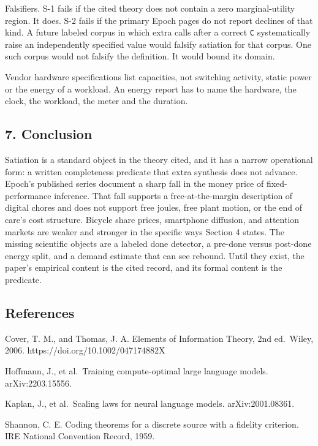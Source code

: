\documentclass[
  10pt,
]{article}
\begin{document}
Falsifiers. S-1 fails if the cited theory does not contain a zero
marginal-utility region. It does. S-2 fails if the primary Epoch pages
do not report declines of that kind. A future labeled corpus in which
extra calls after a correct \texttt{C} systematically raise an
independently specified value would falsify satiation for that corpus.
One such corpus would not falsify the definition. It would bound its
domain.

Vendor hardware specifications list capacities, not switching activity,
static power or the energy of a workload. An energy report has to name
the hardware, the clock, the workload, the meter and the duration.

\subsection{7. Conclusion}\label{conclusion}

Satiation is a standard object in the theory cited, and it has a narrow
operational form: a written completeness predicate that extra synthesis
does not advance. Epoch's published series document a sharp fall in the
money price of fixed-performance inference. That fall supports a
free-at-the-margin description of digital chores and does not support
free joules, free plant motion, or the end of care's cost structure.
Bicycle share prices, smartphone diffusion, and attention markets are
weaker and stronger in the specific ways Section 4 states. The missing
scientific objects are a labeled done detector, a pre-done versus
post-done energy split, and a demand estimate that can see rebound.
Until they exist, the paper's empirical content is the cited record, and
its formal content is the predicate.

\subsection{References}\label{references}

Cover, T. M., and Thomas, J. A. Elements of Information Theory, 2nd
ed.~Wiley, 2006. https://doi.org/10.1002/047174882X

Hoffmann, J., et al.~Training compute-optimal large language models.
arXiv:2203.15556.

Kaplan, J., et al.~Scaling laws for neural language models.
arXiv:2001.08361.

Shannon, C. E. Coding theorems for a discrete source with a fidelity
criterion. IRE National Convention Record, 1959.
\end{document}
